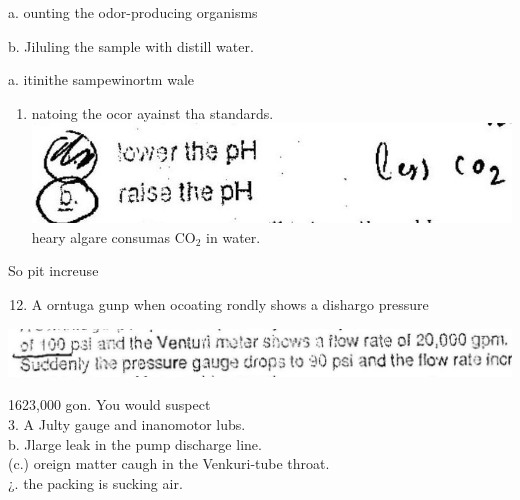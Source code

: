 \documentclass[10pt]{article}
\begin{document}
a. ounting the odor-producing organisms

b. Jiluling the sample with distill water.

a. itinithe sampewinortm wale

\begin{enumerate}
  \item natoing the ocor ayainst tha standards.\\

\includegraphics[max width=\textwidth]{2022_11_11_ca6a6c1a0324ee23e523g-03}\\
heary algare consumas $\mathrm{CO}_{2}$ in water.
\end{enumerate}

So pit increuse

\begin{enumerate}
  \setcounter{enumi}{11}
  \item A orntuga gunp when ocoating rondly shows a dishargo pressure
\end{enumerate}

\includegraphics[max width=\textwidth]{2022_11_11_ca6a6c1a0324ee23e523g-03(1)}

1623,000 gon. You would suspect\\
3. A Julty gauge and inanomotor lubs.\\
b. Jlarge leak in the pump discharge line.\\
(c.) oreign matter caugh in the Venkuri-tube throat.\\
¿. the packing is sucking air.
\end{document}
